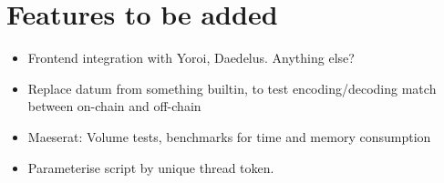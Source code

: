 \documentclass{article}
\begin{document}
\section{Features to be added}

\begin{itemize}
  \item Frontend integration with Yoroi, Daedelus. Anything else?
  \item Replace datum from something builtin, to test encoding/decoding match
    between on-chain and off-chain
  \item Maeserat: Volume tests, benchmarks for time and memory consumption
  \item Parameterise script by unique thread token.
\end{itemize}
\end{document}
